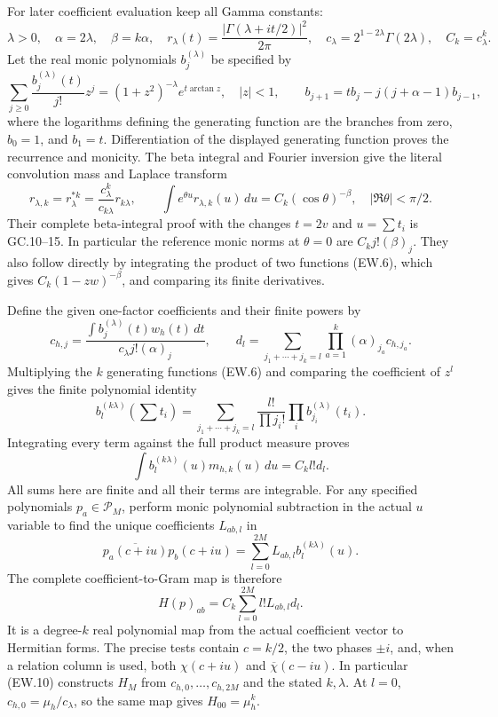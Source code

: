 For later coefficient evaluation keep all Gamma constants:
\[
 \lambda>0,\quad\alpha=2\lambda,\quad\beta=k\alpha,\quad
 r_\lambda(t)=\frac{|\Gamma(\lambda+it/2)|^2}{2\pi},\quad
 c_\lambda=2^{1-2\lambda}\Gamma(2\lambda),\quad C_k=c_\lambda^k.
                                                               \tag{EW.5}
\]
Let the real monic polynomials $b_j^{(\lambda)}$ be specified by
\[
 \sum_{j\ge0}\frac{b_j^{(\lambda)}(t)}{j!}z^j
 =(1+z^2)^{-\lambda}e^{t\arctan z},\quad |z|<1,
 \qquad
 b_{j+1}=tb_j-j(j+\alpha-1)b_{j-1},                          \tag{EW.6}
\]
where the logarithms defining the generating function are the branches
from zero, $b_0=1$, and $b_1=t$. Differentiation of the displayed
generating function proves the recurrence and monicity. The beta
integral and Fourier inversion give the literal convolution mass and
Laplace transform
\[
 r_{\lambda,k}=r_\lambda^{*k}
   =\frac{c_\lambda^k}{c_{k\lambda}}r_{k\lambda},\qquad
 \int e^{\theta u}r_{\lambda,k}(u)\,du
    =C_k(\cos\theta)^{-\beta},\quad |\Re\theta|<\pi/2.
                                                               \tag{EW.7}
\]
Their complete beta-integral proof with the changes $t=2v$ and
$u=\sum t_i$ is GC.10--15. In particular the reference monic norms
at $\theta=0$ are $C_kj!(\beta)_j$. They also follow directly by
integrating the product of two functions (EW.6), which gives
$C_k(1-zw)^{-\beta}$, and comparing its finite derivatives.

Define the given one-factor coefficients and their finite powers by
\[
 c_{h,j}=\frac{\int b_j^{(\lambda)}(t)w_h(t)\,dt}
                  {c_\lambda j!(\alpha)_j},\qquad
 d_l=\sum_{j_1+\cdots+j_k=l}\prod_{a=1}^k(\alpha)_{j_a}c_{h,j_a}.
                                                               \tag{EW.8}
\]
Multiplying the $k$ generating functions (EW.6) and comparing the
coefficient of $z^l$ gives the finite polynomial identity
\[
 b_l^{(k\lambda)}(\textstyle\sum t_i)
   =\sum_{j_1+\cdots+j_k=l}\frac{l!}{\prod j_i!}
                      \prod_i b_{j_i}^{(\lambda)}(t_i).
\]
Integrating every term against the full product measure proves
\[
 \int b_l^{(k\lambda)}(u)m_{h,k}(u)\,du=C_kl!d_l.
                                                               \tag{EW.9}
\]
All sums here are finite and all their terms are integrable. For any
specified polynomials $p_a\in\mathcal P_M$, perform monic
polynomial subtraction in the actual $u$ variable to find the unique
coefficients $L_{ab,l}$ in
\[
 \overline{p_a(c+iu)}p_b(c+iu)
      =\sum_{l=0}^{2M}L_{ab,l}b_l^{(k\lambda)}(u).
\]
The complete coefficient-to-Gram map is therefore
\[
 H(p)_{ab}=C_k\sum_{l=0}^{2M}l!L_{ab,l}d_l.                  \tag{EW.10}
\]
It is a degree-$k$ real polynomial map from the actual coefficient
vector to Hermitian forms. The precise tests contain $c=k/2$, the
two phases $\pm i$, and, when a relation column is used, both
$\chi(c+iu)$ and $\overline\chi(c-iu)$. In particular (EW.10)
constructs $H_M$ from $c_{h,0},\ldots,c_{h,2M}$ and the stated
$k,\lambda$. At $l=0$, $c_{h,0}=\mu_h/c_\lambda$, so the
same map gives $H_{00}=\mu_h^k$.

